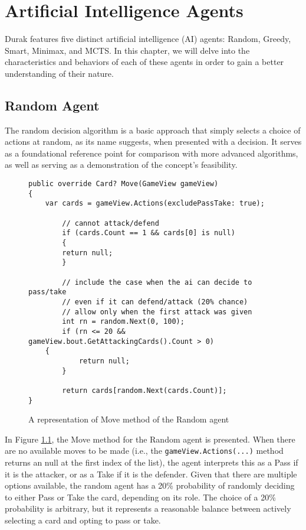 \chapter{Artificial Intelligence Agents}
\label{AIAgents}

Durak features five distinct artificial intelligence (AI) agents: Random, Greedy, Smart, Minimax, and MCTS. In this chapter, we will delve into the characteristics and behaviors of each of these agents in order to gain a better understanding of their nature. 

\section{Random Agent}
The random decision algorithm is a basic approach that simply selects a choice of actions at random, as its name suggests, when presented with a decision. It serves as a foundational reference point for comparison with more advanced algorithms, as well as serving as a demonstration of the concept's feasibility. 

\begin{figure}[h]
\captionsetup{justification=centering}
\begin{lstlisting}
public override Card? Move(GameView gameView)
{
	var cards = gameView.Actions(excludePassTake: true);

    	// cannot attack/defend
    	if (cards.Count == 1 && cards[0] is null)
    	{
		return null;
    	}

    	// include the case when the ai can decide to pass/take
    	// even if it can defend/attack (20% chance)
    	// allow only when the first attack was given
    	int rn = random.Next(0, 100);
    	if (rn <= 20 && gameView.bout.GetAttackingCards().Count > 0)
	{
        	return null;
    	}

    	return cards[random.Next(cards.Count)];
}
\end{lstlisting}
\caption{A representation of Move method of the Random agent}
\label{fig:randomMove}
\end{figure}

In Figure \ref{fig:randomMove}, the Move method for the Random agent is presented. When there are no available moves to be made (i.e., the \texttt{gameView.Actions(...)} method returns an null at the first index of the list), the agent interprets this as a Pass if it is the attacker, or as a Take if it is the defender. Given that there are multiple options available, the random agent has a 20\% probability of randomly deciding to either Pass or Take the card, depending on its role. The choice of a 20\% probability is arbitrary, but it represents a reasonable balance between actively selecting a card and opting to pass or take.


